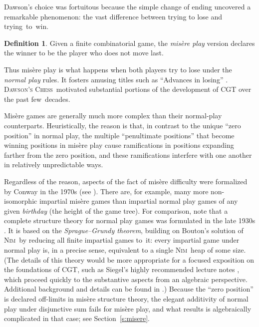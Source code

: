 \documentclass[12pt]{amsart}
\numberwithin{equation}{section}
\theoremstyle{definition}
\newtheorem{defn}[thm]{Definition}
\begin{document}
\noindent
Dawson's choice was fortuitous because the simple change of ending
uncovered a remarkable phenomenon: the vast difference between trying
to lose and trying~to~win.

\begin{defn}
Given a finite combinatorial game, the \emph{mis\`ere play} version
declares the winner to be the player who does not move last.
\end{defn}

\noindent
Thus mis\`ere play is what happens when both players try to lose under
the \emph{normal play} rules.  It fosters amusing titles such as
``Advances in losing'' \cite{plambeck09}.  {\textsc{Dawson's Chess}}\ motivated
substantial portions of the development of CGT over the past
few~decades.

Mis\`ere games are generally much more complex than their normal-play
counterparts.  Heuristically, the reason is that, in contrast to the
unique ``zero position'' in normal play, the multiple ``penultimate
positions'' that become winning positions in mis\`ere play cause
ramifications in positions expanding farther from the zero position,
and these ramifications interfere with one another in relatively
unpredictable ways.

Regardless of the reason, aspects of the fact of mis\`ere difficulty
were formalized by Conway in the 1970s (see \cite{ONAG}).  There are,
for example, many more non-isomorphic impartial mis\`ere games than
impartial normal play games of any given \emph{birthday} (the height
of the game tree).  For comparison, note that a complete structure
theory for normal play games was formulated in the late 1930s
\cite{sprague36,grundy39}.  It is based on the \emph{Sprague--Grundy
theorem}, building on Bouton's solution of {\textsc{Nim}}\ by reducing all
finite impartial games to~it: every impartial game under normal play
is, in a precise sense, equivalent to a single {\textsc{Nim}}\ heap of some
size.  (The details of this theory would be more appropriate for a
focused exposition on the foundations of CGT, such as Siegel's highly
recommended lecture notes \cite{siegel06}, which proceed quickly to
the substantive aspects from an algebraic perspective.  Additional
background and details can be found in \cite{lessons,winningWays1}.)
Because the ``zero position'' is declared off-limits in mis\`ere
structure theory, the elegant additivity of normal play under
disjunctive sum fails for mis\`ere play, and what results is
algebraically complicated in that case; see Section~\ref{s:misere}.
\end{document}
